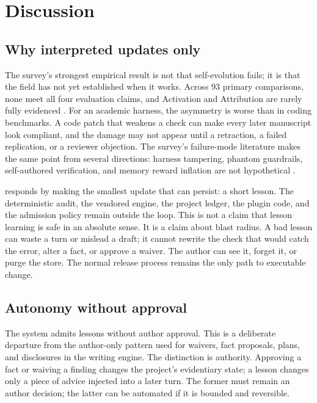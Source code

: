 \section{Discussion}
\label{sec:discussion}

\subsection{Why interpreted updates only}
The survey's strongest empirical result is not that self-evolution fails; it is that the field has not yet established when it works. Across 93 primary comparisons, none meet all four evaluation claims, and Activation and Attribution are rarely fully evidenced \citep{wei2026harnessrsi}. For an academic harness, the asymmetry is worse than in coding benchmarks. A code patch that weakens a check can make every later manuscript look compliant, and the damage may not appear until a retraction, a failed replication, or a reviewer objection. The survey's failure-mode literature makes the same point from several directions: harness tampering, phantom guardrails, self-authored verification, and memory reward inflation are not hypothetical \citep{wang2026tampering,wang2026phantom,guo2026selfverification,asadolahi2026inflation}.

\system{} responds by making the smallest update that can persist: a short lesson. The deterministic audit, the vendored engine, the project ledger, the plugin code, and the admission policy remain outside the loop. This is not a claim that lesson learning is safe in an absolute sense. It is a claim about blast radius. A bad lesson can waste a turn or mislead a draft; it cannot rewrite the check that would catch the error, alter a fact, or approve a waiver. The author can see it, forget it, or purge the store. The normal release process remains the only path to executable change.

\subsection{Autonomy without approval}
The system admits lessons without author approval. This is a deliberate departure from the author-only pattern used for waivers, fact proposals, plans, and disclosures in the writing engine. The distinction is authority. Approving a fact or waiving a finding changes the project's evidentiary state; a lesson changes only a piece of advice injected into a later turn. The former must remain an author decision; the latter can be automated if it is bounded and reversible.

